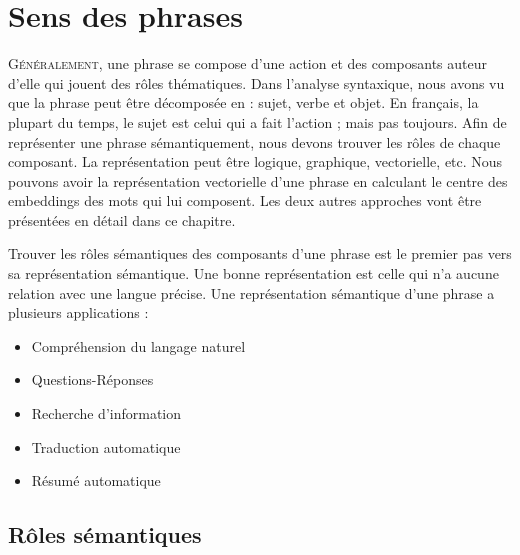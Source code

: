 \documentclass{KodeBook}
\begin{document}
		\mainmatter
	
\fi
\chapter{Sens des phrases}

\begin{introduction}
	\lettrine{G}{énéralement}, une phrase se compose d'une action et des composants auteur d'elle qui jouent des rôles thématiques.
	Dans l'analyse syntaxique, nous avons vu que la phrase peut être décomposée en : sujet, verbe et objet.
	En français, la plupart du temps, le sujet est celui qui a fait l'action ; mais pas toujours. 
	Afin de représenter une phrase sémantiquement, nous devons trouver les rôles de chaque composant. 
	La représentation peut être logique, graphique, vectorielle, etc. 
	Nous pouvons avoir la représentation vectorielle d'une phrase en calculant le centre des embeddings des mots qui lui composent. 
	Les deux autres approches vont être présentées en détail dans ce chapitre.  
\end{introduction} 


Trouver les rôles sémantiques des composants d'une phrase est le premier pas vers sa représentation sémantique. 
Une bonne représentation est celle qui n'a aucune relation avec une langue précise. 
Une représentation sémantique d'une phrase a plusieurs applications : 
\begin{itemize}
	\item Compréhension du langage naturel
	\item Questions-Réponses
	\item Recherche d'information
	\item Traduction automatique
	\item Résumé automatique
\end{itemize}

\section{Rôles sémantiques}
\end{document}
